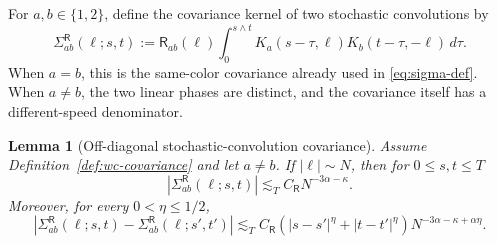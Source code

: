 \documentclass[10pt]{amsart}
\numberwithin{equation}{section}
\theoremstyle{plain}
\newtheorem{lemma}[theorem]{Lemma}
\theoremstyle{definition}
\theoremstyle{remark}
\begin{document}
For \(a,b\in\{1,2\}\), define the covariance kernel of two stochastic convolutions by
\begin{equation}\label{eq:wc-covkernel-def}
\Sigma_{ab}^{\mathsf R}(\ell;s,t)
:=\mathsf R_{ab}(\ell)\int_0^{s\wedge t}
        K_a(s-\tau,\ell)K_b(t-\tau,-\ell)\,d\tau.
\end{equation}
When \(a=b\), this is the same-color covariance already used in \eqref{eq:sigma-def}.  When \(a\ne b\), the two linear phases are distinct, and the covariance itself has a different-speed denominator.

\begin{lemma}[Off-diagonal stochastic-convolution covariance]\label{lem:wc-offdiag-covariance}
Assume Definition~\ref{def:wc-covariance} and let \(a\ne b\).  If \(|\ell|\sim N\), then for \(0\le s,t\le T\)
\begin{equation}\label{eq:wc-offdiag-cov-bound}
        |\Sigma_{ab}^{\mathsf R}(\ell;s,t)|
        \lesssim_T C_{\mathsf R}N^{-3\alpha-\kappa}.
\end{equation}
Moreover, for every \(0<\eta\le1/2\),
\begin{equation}\label{eq:wc-offdiag-cov-increment}
        |\Sigma_{ab}^{\mathsf R}(\ell;s,t)-\Sigma_{ab}^{\mathsf R}(\ell;s',t')|
        \lesssim_T C_{\mathsf R}(|s-s'|^\eta+|t-t'|^\eta)
        N^{-3\alpha-\kappa+\alpha\eta}.
\end{equation}
\end{lemma}
\end{document}
